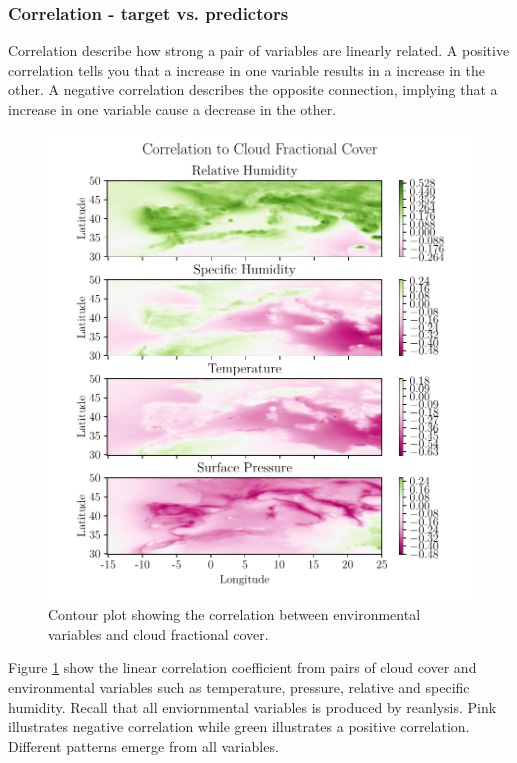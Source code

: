 \subsubsection{Correlation - target vs. predictors}
Correlation describe how strong a pair of variables are linearly related. A positive correlation tells you that a increase in one variable results in a increase in the other. A negative correlation describes the opposite connection, implying that a increase in one variable cause a decrease in the other.
\begin{figure}[ht]
    \centering
    \includegraphics{python_figs/correlation_figure.pdf}
    \caption{Contour plot showing the correlation between environmental variables and cloud fractional cover. }
    \label{fig:correlation_tcc_vs_envio}
\end{figure}
Figure \ref{fig:correlation_tcc_vs_envio} show the linear correlation coefficient from pairs of cloud cover and environmental variables such as temperature, pressure, relative and specific humidity. Recall that all enviornmental variables is produced by reanlysis. Pink illustrates negative correlation while green illustrates a positive correlation. Different patterns emerge from all variables. %

